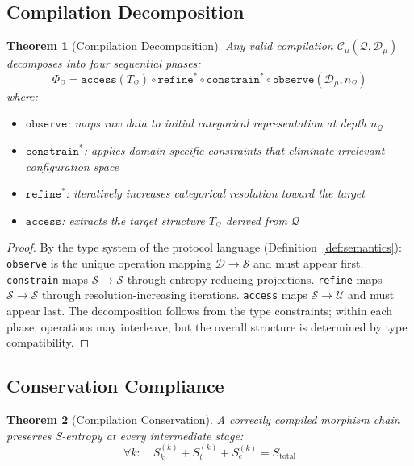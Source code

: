 \documentclass[10pt,twocolumn]{article}
\newtheorem{theorem}{Theorem}[section]
\theoremstyle{definition}
\theoremstyle{remark}
\newcommand{\Sk}{S_k}
\newcommand{\St}{S_t}
\newcommand{\Se}{S_e}
\newcommand{\Sspace}{\mathcal{S}}
\newcommand{\morphism}{\Phi}
\newcommand{\question}{\mathcal{Q}}
\newcommand{\dataset}{\mathcal{D}}
\newcommand{\understanding}{\mathcal{U}}
\newcommand{\Sk}{\mathscr{S}_k}
\newcommand{\Se}{\mathscr{S}_e}
\begin{document}
\subsection{Compilation Decomposition}

\begin{theorem}[Compilation Decomposition]
\label{thm:decomposition}
Any valid compilation $\mathcal{C}_\mu(\question, \dataset_\mu)$ decomposes into four sequential phases:
\begin{equation}
\morphism_\question = \texttt{access}(T_\question) \circ \texttt{refine}^* \circ \texttt{constrain}^* \circ \texttt{observe}(\dataset_\mu, n_\question)
\end{equation}
where:
\begin{itemize}[nosep]
\item $\texttt{observe}$: maps raw data to initial categorical representation at depth $n_\question$
\item $\texttt{constrain}^*$: applies domain-specific constraints that eliminate irrelevant configuration space
\item $\texttt{refine}^*$: iteratively increases categorical resolution toward the target
\item $\texttt{access}$: extracts the target structure $T_\question$ derived from $\question$
\end{itemize}
\end{theorem}

\begin{proof}
By the type system of the protocol language (Definition~\ref{def:semantics}): \texttt{observe} is the unique operation mapping $\dataset \to \Sspace$ and must appear first. \texttt{constrain} maps $\Sspace \to \Sspace$ through entropy-reducing projections. \texttt{refine} maps $\Sspace \to \Sspace$ through resolution-increasing iterations. \texttt{access} maps $\Sspace \to \understanding$ and must appear last. The decomposition follows from the type constraints; within each phase, operations may interleave, but the overall structure is determined by type compatibility.
\end{proof}

\subsection{Conservation Compliance}

\begin{theorem}[Compilation Conservation]
\label{thm:compilation_conservation}
A correctly compiled morphism chain preserves S-entropy at every intermediate stage:
\begin{equation}
\forall k: \quad \Sk^{(k)} + \St^{(k)} + \Se^{(k)} = S_{\text{total}}
\end{equation}
\end{theorem}
\end{document}
